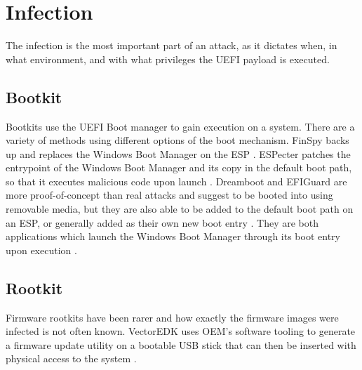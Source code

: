 \section{Infection}

The infection is the most important part of an attack, as it dictates when, in what environment, and with what privileges the \ac{UEFI} payload is executed.

\subsection{Bootkit}

Bootkits use the \ac{UEFI} Boot manager to gain execution on a system.
There are a variety of methods using different options of the boot mechanism.
FinSpy backs up and replaces the Windows Boot Manager  on the \ac{ESP} \cite{finspy}.
ESPecter patches the entrypoint of the Windows Boot Manager  and its copy  in the default boot path, so that it executes malicious code upon launch \cite{especter}.
Dreamboot and EFIGuard are more proof-of-concept than real attacks and suggest to be booted into using removable media, but they are also able to be added to the default boot path on an \ac{ESP}, or generally added as their own new boot entry \cite{efiguard}.
They are both applications which launch the Windows Boot Manager through its boot entry upon execution \cite{dreamboot, efiguard}.

\subsection{Rootkit}

Firmware rootkits have been rarer and how exactly the firmware images were infected is not often known.
VectorEDK uses \ac{OEM}'s software tooling to generate a firmware update utility on a bootable \ac{USB} stick that can then be inserted with physical access to the system \cite{mosaicregressor}.

